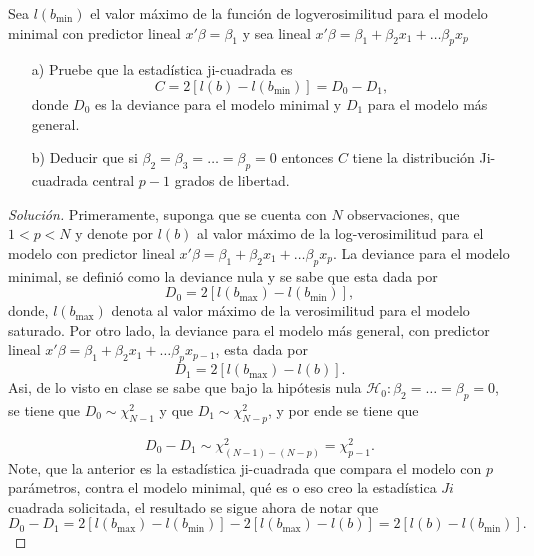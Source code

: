 \documentclass[10.5pt,notitlepage]{article}
\newenvironment{solucion}
  {\begin{proof}[Solución]}
  {\end{proof}}
\newcommand{\corch}[1]{\left[ #1 \right]}
\theoremstyle{plain}
\begin{document}
\begin{exo}\label{Ej.2}
Sea \(l(b_{\min})\) el valor máximo de la función de logverosimilitud para el modelo minimal con predictor lineal \(x'\beta = \beta_1\) y sea lineal \(x'\beta = \beta_1 + \beta_2 x_1 + \hdots \beta_p x_{p}\)
\begin{itemize}
    \item[a)] Pruebe que la estadística ji-cuadrada es 
    \[
    C = 2\corch{l(b) - l(b_{\min})} = D_0 - D_1, 
    \]
    donde \(D_0\) es la deviance para el modelo minimal y \(D_1\) para el modelo más general. 
    \item[b)] Deducir que si \(\beta_2 = \beta_3 = \hdots = \beta_p = 0\) entonces \(C\) tiene la distribución Ji-cuadrada central \(p-1\) grados de libertad.
\end{itemize}
\end{exo} 
\begin{solucion}
Primeramente, suponga que se cuenta con \(N\) observaciones, que \(1< p < N\) y denote por \(l(b)\) al valor máximo de la log-verosimilitud para el modelo con predictor lineal \(x'\beta =\beta_1 + \beta_2 x_1 + \hdots \beta_p x_{p}\). La deviance para el modelo minimal, se definió como la deviance nula y se sabe que esta dada por
\[
D_{0} = 2\corch{l(b_{\max}) - l(b_{\min})}, 
\]
donde, \(l(b_{\max})\) denota al valor máximo de la verosimilitud para el modelo saturado. Por otro lado, la deviance para el modelo más general, con predictor lineal \(x'\beta =\beta_1 + \beta_2 x_1 + \hdots \beta_p x_{p-1}\), esta dada por 
\[
D_{1} =  2\corch{l(b_{\max}) - l(b)}. 
\]
Asi, de lo visto en clase se sabe que bajo la hipótesis nula \(\mathcal{H}_0: \beta_{2} = \hdots = \beta_{p} = 0\), se tiene que \(D_0 \sim \chi^{2}_{N-1}\) y que \(D_{1} \sim \chi_{N-p}^{2}\), y por ende se tiene que
 
\[
  D_{0} - D_{1} \sim \chi^{2}_{(N-1)-(N-p)} = \chi^{2}_{p-1}.
\]
Note, que la anterior es la estadística ji-cuadrada que compara el modelo con \(p\) parámetros, contra el modelo minimal, qué es o eso creo la estadística \(Ji\) cuadrada solicitada, el resultado se sigue ahora de notar que 
\[
  D_{0} - D_{1} =  2\corch{l(b_{\max}) - l(b_{\min})} - 2\corch{l(b_{\max}) - l(b)} =  2\corch{l(b) - l(b_{\min})}.
\]
\end{solucion}
\end{document}
